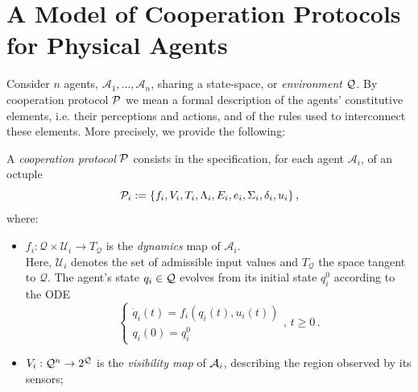 \documentclass[journal, onecolumn, 12pt]{styles/IEEEtran}
\renewcommand{\AFnewpage}{}
\begin{document}
\AFnewpage

%
%
%

\newpage


\section{A Model of Cooperation Protocols for Physical Agents}
\label{sec:model}

Consider $n$ agents, $\mathcal{A}_1, \dots, \mathcal{A}_n$, sharing a state-space, or {\em environment} $\Q$. By cooperation protocol $\P$ we mean a formal description of the agents' constitutive elements, i.e. their perceptions and actions, and of the rules used to interconnect these elements. More precisely, we  provide the following:
%
\begin{definition}
\label{def:cooperation-protocol}
A {\em cooperation protocol} $\P$ consists in the specification, for each agent $\mathcal{A}_i$, of an octuple 
$$
\P_i := \{ f_i, V_i, T_i, \Lambda_i, E_i, e_i, \Sigma_i, \delta_i, u_i\} \, , 
$$
where:
\begin{itemize}
\item
$f_i : \mathcal{Q} \times \mathcal{U}_i \rightarrow T_\mathcal{Q}$ is the {\em dynamics} map of $\mathcal{A}_i$. \\ Here, $\mathcal{U}_i$ denotes the set of admissible input values and $T_\mathcal{Q}$ the space tangent to $\mathcal{Q}$. The agent's state $q_i \in \Q$ evolves from its initial state $q_i^0$ according to the ODE
$$
\left\lbrace
\begin{array}{l}
\dot{q}_i(t) = f_i(q_i(t), u_i(t)) \\
q_i(0) = q_i^0 
\end{array}
\right. 
, \, t \geq 0 \, .
$$

\item ${\vi : \Q^n \rightarrow 2^\Q}$ is the {\em visibility map} of
  $\ai$, describing the region observed by its sensors;


\end{itemize}
\end{definition}
\end{document}

